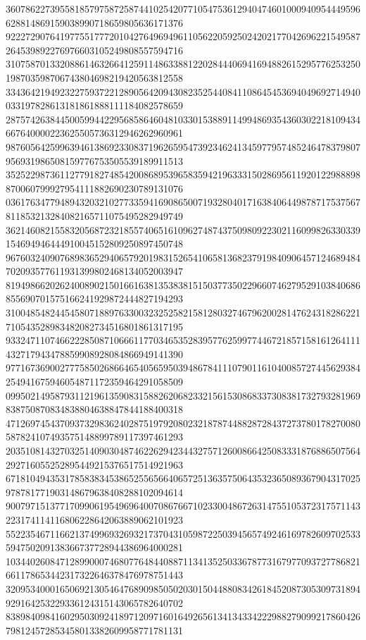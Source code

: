 \begin{DoxyCode}
      360786227395581857975872587441025420771054753612940474601000940954449596628814869159038990718659805636171376
      922272907641977551777201042764969496110562205925024202177042696221549587264539892276976603105249808557594716
      310758701332088614632664125911486338812202844406941694882615295776253250198703598706743804698219420563812558
      334364219492322759372212890564209430823525440841108645453694049692714940033197828613181861888111184082578659
      287574263844500599442295685864604810330153889114994869354360302218109434667640000223625505736312946262960961
      987605642599639461386923308371962659547392346241345977957485246478379807956931986508159776753505539189911513
      352522987361127791827485420086895396583594219633315028695611920122988898870060799927954111882690230789131076
      036176347794894320321027733594169086500719328040171638406449878717537567811853213284082165711075495282949749
      362146082155832056872321855740651610962748743750980922302116099826330339154694946444910045152809250897450748
      967603240907689836529406579201983152654106581368237919840906457124689484702093577611931399802468134052003947
      819498662026240089021501661638135383815150377350229660746279529103840686855690701575166241929872444827194293
      310048548244545807188976330032325258215812803274679620028147624318286221710543528983482082734516801861317195
      933247110746622285087106661177034653528395776259977446721857158161264111432717943478859908928084866949141390
      977167369002777585026866465405659503948678411107901161040085727445629384254941675946054871172359464291058509
      099502149587931121961359083158826206823321561530868337308381732793281969838750870834838804638847844188400318
      471269745437093732983624028751979208023218787448828728437273780178270080587824107493575148899789117397461293
      203510814327032514090304874622629423443275712600866425083331876886507564292716055252895449215376517514921963
      671810494353178583834538652556566406572513635750643532365089367904317025978781771903148679638408288102094614
      900797151377170990619549696400708676671023300486726314755105372317571143223174114116806228642063889062101923
      552235467116621374996932693217370431059872250394565749246169782609702533594750209138366737728944386964000281
      103440260847128990007468077648440887113413525033678773167977093727786821661178653442317322646378476978751443
      320953400016506921305464768909850502030150448808342618452087305309731894929164253229336124315143065782640702
      838984098416029503092418971209716016492656134134334222988279099217860426798124572853458013382609958771781131

\end{DoxyCode}
